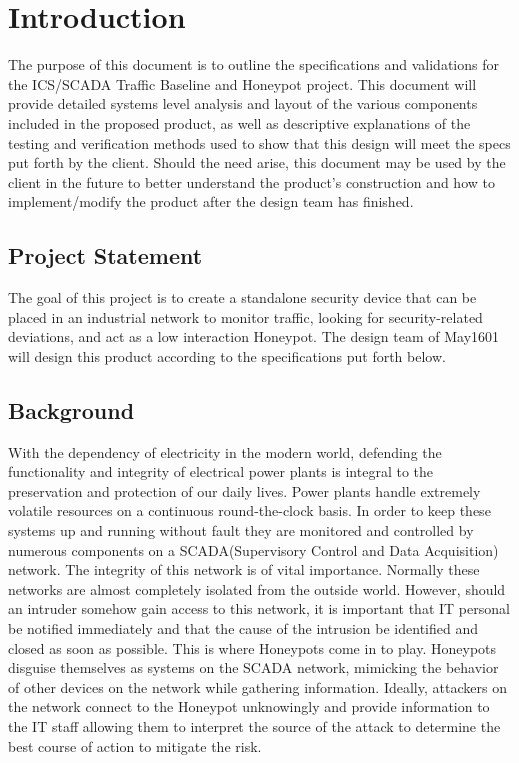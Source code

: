 \chapter{Introduction}

The purpose of this document is to outline the specifications and validations for the ICS/SCADA Traffic Baseline and Honeypot project. This document will provide detailed systems level analysis and layout of the various components included in the proposed product, as well as descriptive explanations of the testing and verification methods used to show that this design will meet the specs put forth by the client. Should the need arise, this document may be used by the client in the future to better understand the product's construction and how to implement/modify the product after the design team has finished.

\section{Project Statement}

 The goal of this project is to create a standalone security device that can be placed in an industrial network to monitor traffic, looking for security-related deviations, and act as a low interaction Honeypot. The design team of May1601 will design this product according to the specifications put forth below.

\section{Background}

With the dependency of electricity in the modern world, defending the functionality and integrity of electrical power plants is integral to the preservation and protection of our daily lives. Power plants handle extremely volatile resources on a continuous round-the-clock basis. In order to keep these systems up and running without fault they are monitored and controlled by numerous components on a SCADA(Supervisory Control and Data Acquisition) network. The integrity of this network is of vital importance. Normally these networks are almost completely isolated from the outside world. However, should an intruder somehow gain access to this network, it is important that IT personal be notified immediately and that the cause of the intrusion be identified and closed as soon as possible. This is where Honeypots come in to play. Honeypots disguise themselves as systems on the SCADA network, mimicking the behavior of other devices on the network while gathering information. Ideally, attackers on the network connect to the Honeypot unknowingly and provide information to the IT staff allowing them to interpret the source of the attack to determine the best course of action to mitigate the risk. 

